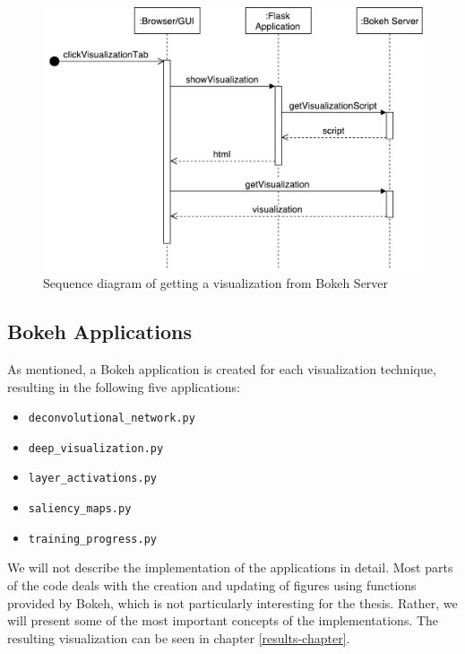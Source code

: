 \begin{figure}[h!]
    \centering
        \includegraphics[width=\textwidth]{fig/sequence-bokeh.pdf}
        \caption{Sequence diagram of getting a visualization from Bokeh Server}
        \label{bokeh-server}
\end{figure}

\subsection{Bokeh Applications}

As mentioned, a Bokeh application is created for each visualization technique, resulting in the following five applications:

\begin{itemize}
    \item \texttt{deconvolutional\_network.py}
    \item \texttt{deep\_visualization.py}
    \item \texttt{layer\_activations.py}
    \item \texttt{saliency\_maps.py}
    \item \texttt{training\_progress.py}
\end{itemize}

\noindent We will not describe the implementation of the applications in detail. Most parts of the code deals with the creation and updating of figures using functions provided by Bokeh, which is not particularly interesting for the thesis. Rather, we will present some of the most important concepts of the implementations. The resulting visualization can be seen in chapter \ref{results-chapter}.

